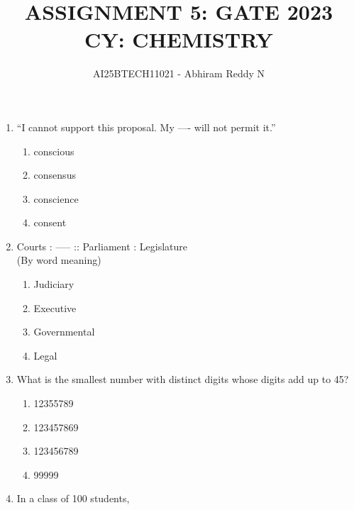 \documentclass[journal,12pt,onecolumn]{IEEEtran}
\theoremstyle{remark}
\begin{document}
\title{
ASSIGNMENT 5: GATE 2023 \\
CY: CHEMISTRY}
\author{AI25BTECH11021 - Abhiram Reddy N}
\maketitle


\begin{enumerate}


\item ``I cannot support this proposal. My ---- will not permit it.'' \hfill{}
\begin{multicols}{2}
\begin{enumerate}
\item conscious
\item consensus
\item conscience
\item consent
\end{enumerate}
\end{multicols}

\item Courts : -----  :: Parliament : Legislature \\
(By word meaning) \hfill{}
\begin{multicols}{2}
\begin{enumerate}
\item Judiciary
\item Executive
\item Governmental
\item Legal
\end{enumerate}
\end{multicols}

\item What is the smallest number with distinct digits whose digits add up to 45? \hfill{}
\begin{multicols}{2}
\begin{enumerate}
\item 12355789
\item 123457869
\item 123456789
\item 99999
\end{enumerate}
\end{multicols}

\item In a class of 100 students, \hfill{}


\end{enumerate}
\end{document}
